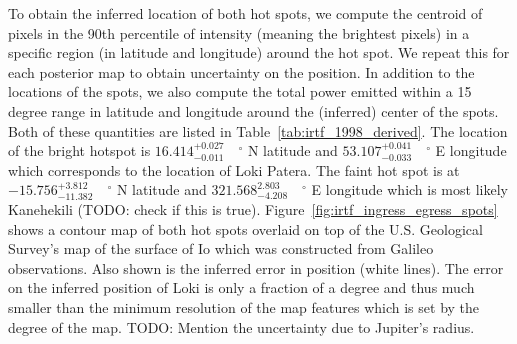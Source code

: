\documentclass[modern]{aastex62}
\begin{document}
To obtain the inferred location of both hot spots, we compute the centroid of pixels in the 90th percentile of intensity (meaning the brightest pixels) in a specific region (in latitude and longitude) around the hot spot. 
We repeat this for each posterior map to obtain uncertainty on the position. 
In addition to the locations of the spots, we also compute the total power emitted within a 15 degree range in latitude and longitude around the (inferred) center of the spots.
Both of these quantities are listed in Table~\ref{tab:irtf_1998_derived}. 
The location of the bright hotspot is $16.414_{-0.011}^{+0.027}\quad^\circ$ N latitude and $53.107_{-0.033}^{+0.041}\quad^\circ$ E longitude which corresponds to the location of Loki Patera.
The faint hot spot is at $-15.756_{-11.382}^{+3.812}\quad ^\circ$ N latitude and $321.568_{-4.208}^{2.803}\quad^\circ$ E longitude which is most likely Kanehekili (TODO: check if this is true).
Figure~\ref{fig:irtf_ingress_egress_spots} shows  a contour map of both hot spots overlaid on top of the U.S. Geological Survey's map of the surface of Io \cite{williams2011} which was constructed from Galileo observations.
Also shown is the inferred error in position (white lines).
The error on the inferred position of Loki is only a fraction of a degree and thus much smaller than the minimum resolution of the map features which is set by the degree of the map.
TODO: Mention the uncertainty due to Jupiter's radius.
\end{document}

